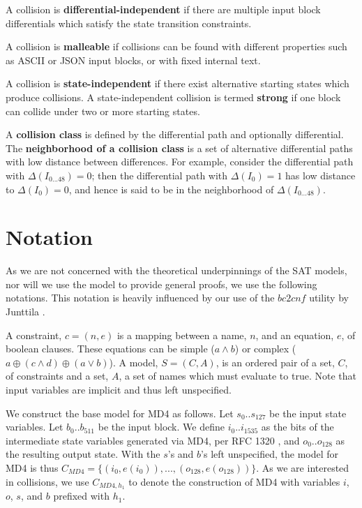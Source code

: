 \documentclass[letterpaper,twocolumn,10pt]{article}
\providecommand{\lxor}{\oplus}
\begin{document}
A collision is \textbf{differential-independent} if there are multiple
input block differentials which satisfy the state transition constraints.

A collision is \textbf{malleable} if collisions can be found with different
properties such as ASCII or JSON input blocks, or with fixed internal text.

A collision is \textbf{state-independent} if there exist alternative
starting states which produce collisions. A state-independent collision
is termed \textbf{strong} if one block can collide under two or more starting
states.

A \textbf{collision class} is defined by the differential path and optionally
differential. The \textbf{neighborhood of a collision class} is a set of
alternative differential paths with low distance between differences.
For example, consider the differential path with $\Delta(I_{0 ... 48}) = 0$;
then the differential path with $\Delta(I_0) = 1$ has low distance to
$\Delta(I_0) = 0$, and hence is said to be in the neighborhood of
$\Delta(I_{0 ... 48})$.


\section{Notation}

As we are not concerned with the theoretical underpinnings of the SAT models,
nor will we use the model to provide general proofs, we use the following
notations. This notation is heavily influenced by our use of the $bc2cnf$
utility by Junttila \cite{circuits}.

A constraint, $c = (n, e)$ is a mapping between a name, $n$, and an equation,
$e$, of boolean clauses. These equations can be simple ($a \land b$) or complex
($a \lxor (c \land d) \lxor (a \lor b)$). A model, $S = (C, A)$, is an ordered
pair of a set, $C$, of constraints and a set, $A$, a set of names which must
evaluate to true. Note that input variables are implicit and thus left
unspecified.

We construct the base model for MD4 as follows. Let $s_{0} .. s_{127}$ be the
input state variables. Let $b_{0} .. b_{511}$ be the input block. We define
$i_0 .. i_{1535}$ as the bits of the intermediate state variables generated
via MD4, per RFC 1320 \cite{rfc1320}, and $o_{0} .. o_{128}$ as the resulting
output state. With the $s$'s and $b$'s left unspecified, the model for MD4
is thus $C_{MD4} = \{(i_0, e(i_0)), ..., (o_{128}, e(o_{128})) \}$. As we
are interested in collisions, we use $C_{MD4, h_1}$ to denote the construction
of MD4 with variables $i$, $o$, $s$, and $b$ prefixed with $h_1$.
\end{document}
